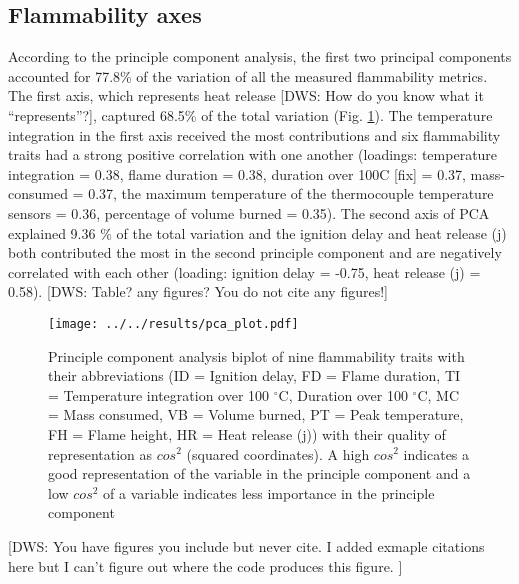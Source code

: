 \documentclass[12pt]{report}
\begin{document}
\subsection{Flammability axes}
According to the principle component analysis, the first two principal components accounted for 77.8\% of the variation of all the measured flammability metrics. The first axis, which represents heat release [DWS: How do you know what it ``represents''?], captured 68.5\% of the total variation (Fig. \ref{fig:pca-plot}). The temperature integration in the first axis received the most contributions and six flammability traits had a strong positive correlation with one another (loadings: temperature integration = 0.38, flame duration = 0.38, duration over 100C [fix] = 0.37, mass-consumed = 0.37, the maximum temperature of the thermocouple temperature sensors = 0.36, percentage of volume burned = 0.35). The second axis of PCA explained 9.36 \% of the total variation and the ignition delay and heat release (j) both contributed the most in the second principle component and are negatively correlated with each other (loading: ignition delay = -0.75, heat release (j) = 0.58). [DWS: Table? any figures? You do not cite any figures!]

\begin{figure}  %
    \centering
    \texttt{[image: ../../results/pca\_plot.pdf]}
    \caption[Principle components results]{\label{fig:pca-plot} Principle component analysis biplot of nine flammability traits with their abbreviations (ID = Ignition delay, FD = Flame duration, TI = Temperature integration over 100 $^{\circ}$C, Duration over 100 $^{\circ}$C, MC = Mass consumed, VB = Volume burned, PT = Peak temperature, FH = Flame height, HR = Heat release (j)) with their quality of representation as $cos^2$ (squared coordinates). A high $cos^2$ indicates a good representation of the variable in the principle component and a low $cos^2$ of a variable indicates less importance in the principle component}
  \end{figure}

  [DWS: You have figures you include but never cite. I added exmaple citations here but I can't figure out where the code produces this figure. ]
\end{document}
